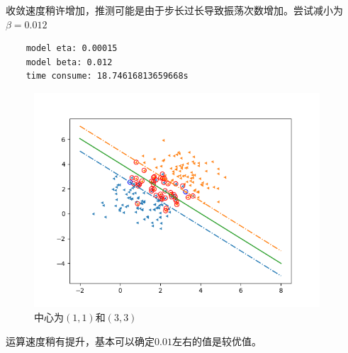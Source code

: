\documentclass{article}
\begin{document}
收敛速度稍许增加，推测可能是由于步长过长导致振荡次数增加。尝试减小为$\beta=0.012$
\begin{verbatim}
    model eta: 0.00015
    model beta: 0.012
    time consume: 18.74616813659668s
    \end{verbatim}
\begin{figure}[H]
        \centering
        \begin{minipage}[t]{1.0\linewidth}
            \centering
            \includegraphics[height=8cm]{runtime_6.png}
            \caption{中心为$(1,1)$和$(3,3)$}
\end{minipage}
\end{figure}
运算速度稍有提升，基本可以确定$0.01$左右的值是较优值。
\end{document}
